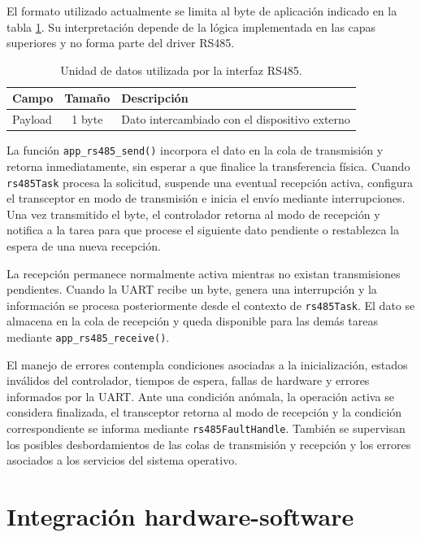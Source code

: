 El formato utilizado actualmente se limita al byte de aplicación indicado en la tabla \ref{tab:rs485_frame}. Su interpretación depende de la lógica implementada en las capas superiores y no forma parte del driver RS485.

\begin{table}[h]
	\centering
	\caption[Unidad de datos RS485]{Unidad de datos utilizada por la interfaz RS485.}
	\begin{tabular}{l c l}
		\toprule
		\textbf{Campo} & \textbf{Tamaño} & \textbf{Descripción} \\
		\midrule
		Payload        & 1 byte          & Dato intercambiado con el dispositivo externo \\
		\bottomrule
	\end{tabular}
	\label{tab:rs485_frame}
\end{table}

La función \texttt{app\_rs485\_send()} incorpora el dato en la cola de transmisión y retorna inmediatamente, sin esperar a que finalice la transferencia física. Cuando \texttt{rs485Task} procesa la solicitud, suspende una eventual recepción activa, configura el transceptor en modo de transmisión e inicia el envío mediante interrupciones. Una vez transmitido el byte, el controlador retorna al modo de recepción y notifica a la tarea para que procese el siguiente dato pendiente o restablezca la espera de una nueva recepción.

La recepción permanece normalmente activa mientras no existan transmisiones pendientes. Cuando la UART recibe un byte, genera una interrupción y la información se procesa posteriormente desde el contexto de \texttt{rs485Task}. El dato se almacena en la cola de recepción y queda disponible para las demás tareas mediante \texttt{app\_rs485\_receive()}.

El manejo de errores contempla condiciones asociadas a la inicialización, estados inválidos del controlador, tiempos de espera, fallas de hardware y errores informados por la UART. Ante una condición anómala, la operación activa se considera finalizada, el transceptor retorna al modo de recepción y la condición correspondiente se informa mediante \texttt{rs485FaultHandle}. También se supervisan los posibles desbordamientos de las colas de transmisión y recepción y los errores asociados a los servicios del sistema operativo.


\section{Integración hardware-software}

